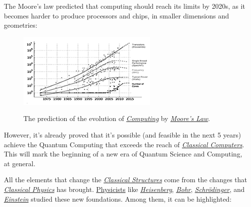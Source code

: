\documentclass[conference]{IEEEtran}
\begin{document}
\vspace{4pt}

The Moore's law predicted that computing should reach its limits by 2020s, as it becomes harder to produce processors and chips, in smaller dimensions and geometries:

\begin{center}
  \begin{figure}[htbp]
    \centerline{\href{https://en.wikipedia.org/wiki/Moore\%27s_law}{\includegraphics{imgs/fig-2.png}}}
    \caption{The prediction of the evolution of \href{https://en.wikipedia.org/wiki/Computing}{\textit{Computing}} by \href{https://en.wikipedia.org/wiki/Moore\%27s_law}{\textit{Moore's Law}}.}
    \label{fig}
  \end{figure}
\end{center}

However, it's already proved that it's possible (and feasible in the next 5 years) achieve the Quantum Computing that exceeds the reach of \href{https://en.wikipedia.org/wiki/Von_Neumann_architecture}{\textit{Classical Computers}}. This will mark the beginning of a new era of Quantum Science and Computing, at general.

\vspace{4pt}

All the elements that change the \href{https://en.wikipedia.org/wiki/Structure_and_Interpretation_of_Classical_Mechanics}{\textit{Classical Structures}} come from the changes that \href{https://en.wikipedia.org/wiki/Classical_physics}{\textit{Classical Physics}} has brought. \href{https://en.wikipedia.org/wiki/Physicist}{Physicists} like \href{https://en.wikipedia.org/wiki/Werner_Heisenberg}{\textit{Heisenberg}}, \href{https://en.wikipedia.org/wiki/Niels_Bohr}{\textit{Bohr}}, \href{https://en.wikipedia.org/wiki/Erwin_Schr\%C3\%B6dinger}{\textit{Schr\"odinger}}, and \href{https://en.wikipedia.org/wiki/Albert_Einstein}{\textit{Einstein}} studied these new foundations. Among them, it can be highlighted:

\vspace{6pt}
\end{document}
